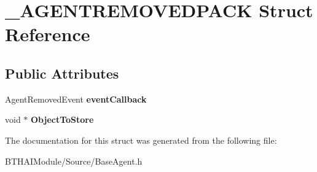 \hypertarget{struct___a_g_e_n_t_r_e_m_o_v_e_d_p_a_c_k}{
\section{\_\-AGENTREMOVEDPACK Struct Reference}
\label{struct___a_g_e_n_t_r_e_m_o_v_e_d_p_a_c_k}
}
\subsection*{Public Attributes}
\begin{DoxyCompactItemize}
\item 
\hypertarget{struct___a_g_e_n_t_r_e_m_o_v_e_d_p_a_c_k_a149d0a8693ec770753aa4bb5338adaea}{
AgentRemovedEvent {\bfseries eventCallback}}
\label{struct___a_g_e_n_t_r_e_m_o_v_e_d_p_a_c_k_a149d0a8693ec770753aa4bb5338adaea}

\item 
\hypertarget{struct___a_g_e_n_t_r_e_m_o_v_e_d_p_a_c_k_a56340d27b027c283b7fcf9e094af5bb1}{
void $\ast$ {\bfseries ObjectToStore}}
\label{struct___a_g_e_n_t_r_e_m_o_v_e_d_p_a_c_k_a56340d27b027c283b7fcf9e094af5bb1}

\end{DoxyCompactItemize}


The documentation for this struct was generated from the following file:\begin{DoxyCompactItemize}
\item 
BTHAIModule/Source/BaseAgent.h\end{DoxyCompactItemize}
